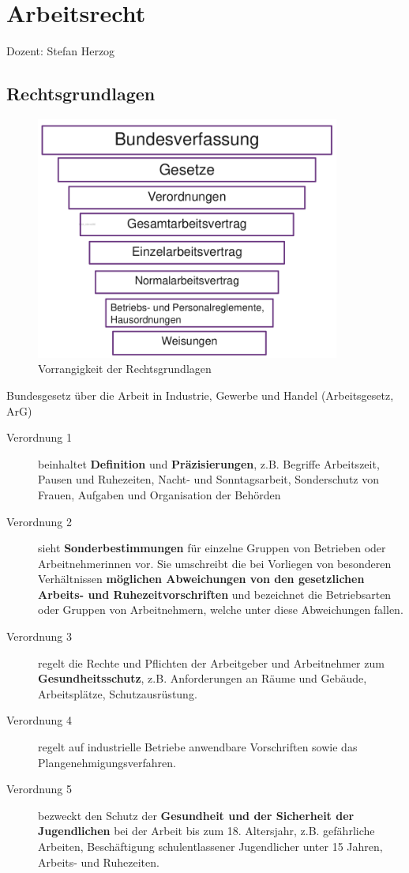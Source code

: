 \chapter{Arbeitsrecht}
Dozent: Stefan Herzog

\section{Rechtsgrundlagen}

\begin{figure}[h]
  \centering
  \includegraphics[width=10cm]{res/arbeitsrecht-vorrangigkeit.png}
  \caption{Vorrangigkeit der Rechtsgrundlagen}
\end{figure}

Bundesgesetz über die Arbeit in Industrie, Gewerbe und Handel (Arbeitsgesetz, ArG)
\begin{description}
  \item[Verordnung 1] beinhaltet \textbf{Definition} und \textbf{Präzisierungen}, z.B. Begriffe Arbeitszeit, Pausen und Ruhezeiten, Nacht- und Sonntagsarbeit, Sonderschutz von Frauen, Aufgaben und Organisation der Behörden
  \item[Verordnung 2] sieht \textbf{Sonderbestimmungen} für einzelne Gruppen von Betrieben oder Arbeitnehmerinnen vor. Sie umschreibt die bei Vorliegen von besonderen Verhältnissen \textbf{möglichen Abweichungen von den gesetzlichen Arbeits- und Ruhezeitvorschriften} und bezeichnet die Betriebsarten oder Gruppen von Arbeitnehmern, welche unter diese Abweichungen fallen.
  \item[Verordnung 3] regelt die Rechte und Pflichten der Arbeitgeber und Arbeitnehmer zum \textbf{Gesundheitsschutz}, z.B. Anforderungen an Räume und Gebäude, Arbeitsplätze, Schutzausrüstung.
  \item[Verordnung 4] regelt auf industrielle Betriebe anwendbare Vorschriften sowie das Plangenehmigungsverfahren.
  \item[Verordnung 5] bezweckt den Schutz der \textbf{Gesundheit und der Sicherheit der Jugendlichen} bei der Arbeit bis zum 18. Altersjahr, z.B. gefährliche Arbeiten, Beschäftigung schulentlassener Jugendlicher unter 15 Jahren, Arbeits- und Ruhezeiten.
\end{description}

